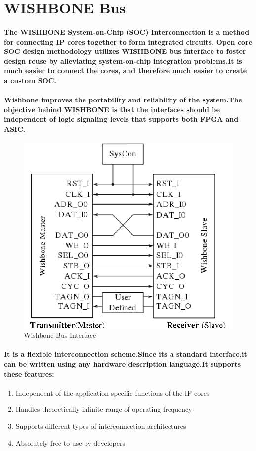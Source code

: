 \documentclass[12pt,a4paper]{report}
\begin{document}
\section{WISHBONE Bus}
\paragraph{\textrm{\textmd{The WISHBONE System-on-Chip (SOC) Interconnection is a method for connecting IP cores together to form integrated circuits. Open core SOC design methodology utilizes WISHBONE bus interface to foster design reuse by alleviating	system-on-chip integration problems.It is much easier to connect the cores, and therefore much easier to create a custom SOC.}}}
\paragraph{\textrm{\textmd{Wishbone improves the portability and reliability of the system.The objective behind WISHBONE is that the interfaces should be independent of logic signaling levels  that supports both FPGA and ASIC.}}}
\begin{figure}[h]
	\centering
	\includegraphics[scale=.4]{interface.png}
	\caption{Wishbone Bus Interface}
	\label{fig:interface}
\end{figure} 		
\paragraph{\textrm{\textmd{It is a flexible interconnection scheme.Since its a standard interface,it can be written using any hardware description language.It supports these features:}}}
\begin{enumerate}[font=$\bullet$\scshape\bfseries]
	\item []Independent of the application specific
	functions of the IP cores
	\item []Handles theoretically infinite range of operating frequency
	\item []Supports different types of interconnection architectures
	\item []Absolutely free to use by developers
\end{enumerate}
\end{document}

